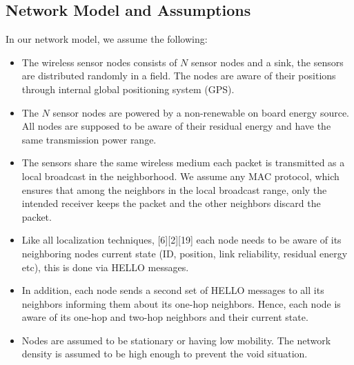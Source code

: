 \documentclass[fleqn,twoside]{article}
\begin{document}
\subsection{Network Model and Assumptions}
In our network model, we assume the following:
\begin{itemize}
  \item The wireless sensor nodes consists of $N$ sensor nodes and a sink, the sensors are distributed randomly in a field. The nodes are aware of their positions through internal global positioning system (GPS).
  \item The $N$ sensor nodes are powered by a non-renewable on board energy source. All 
  nodes are supposed to be aware of their residual energy and have the same transmission power range.
  \item The sensors share the same wireless medium each packet is transmitted as a local broadcast in the neighborhood. We assume any MAC protocol, which ensures that among the neighbors in the local broadcast range, only the intended receiver keeps the packet and the other neighbors discard the packet.
  \item Like all localization techniques, [6][2][19] each node needs to be aware of its 
  neighboring nodes current state (ID, position, link reliability, residual energy etc), this is done via HELLO messages. 
  \item In addition, each node sends a second set of HELLO messages to all its neighbors informing them about its one-hop neighbors. 
  Hence, each node is aware of its one-hop and two-hop neighbors and their current state.
  \item Nodes are assumed to be stationary or having low mobility. The network density is assumed to be high enough to prevent the void situation.
\end{itemize}
\end{document}

